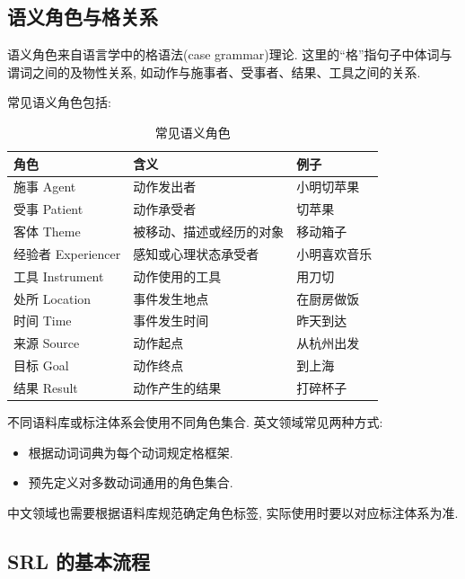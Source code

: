 \subsection{语义角色与格关系}


语义角色来自语言学中的格语法(case grammar)理论.
这里的“格”指句子中体词与谓词之间的及物性关系,
如动作与施事者、受事者、结果、工具之间的关系.

常见语义角色包括:

\begin{table}[H]
\centering
\begingroup
\setlength{\tabcolsep}{2pt}
\small
\caption{常见语义角色}
\begin{tabular}{|p{}|p{}|p{}|}
\hline
角色 & 含义 & 例子 \\ \hline
施事 Agent & 动作发出者 & 小明切苹果 \\ \hline
受事 Patient & 动作承受者 & 切苹果 \\ \hline
客体 Theme & 被移动、描述或经历的对象 & 移动箱子 \\ \hline
经验者 Experiencer & 感知或心理状态承受者 & 小明喜欢音乐 \\ \hline
工具 Instrument & 动作使用的工具 & 用刀切 \\ \hline
处所 Location & 事件发生地点 & 在厨房做饭 \\ \hline
时间 Time & 事件发生时间 & 昨天到达 \\ \hline
来源 Source & 动作起点 & 从杭州出发 \\ \hline
目标 Goal & 动作终点 & 到上海 \\ \hline
结果 Result & 动作产生的结果 & 打碎杯子 \\ \hline
\end{tabular}
\endgroup
\end{table}

不同语料库或标注体系会使用不同角色集合.
英文领域常见两种方式:

\begin{itemize}
\item 根据动词词典为每个动词规定格框架.
\item 预先定义对多数动词通用的角色集合.
\end{itemize}

中文领域也需要根据语料库规范确定角色标签,
实际使用时要以对应标注体系为准.

\subsection{SRL 的基本流程}


